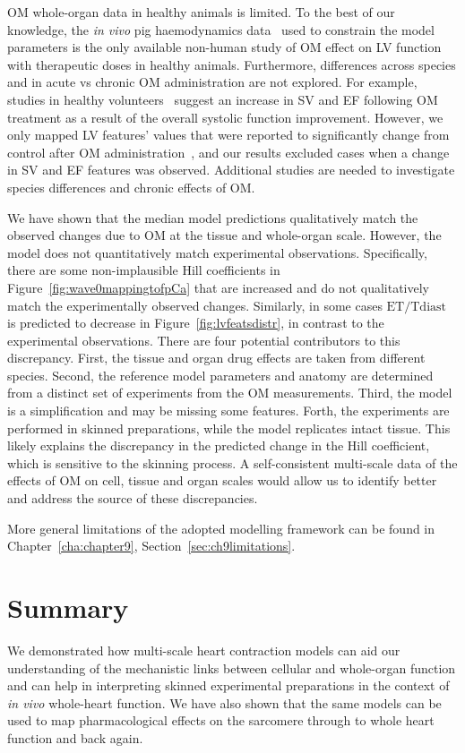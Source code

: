 \vspace{0.2cm}
OM whole-organ data in healthy animals is limited. To the best of our knowledge, the \textit{in vivo} pig haemodynamics data~\cite{Bakkehaug:2015} used to constrain the model parameters is the only available non-human study of OM effect on LV function with therapeutic doses in healthy animals. Furthermore, differences across species and in acute vs chronic OM administration are not explored. For example, studies in healthy volunteers~\cite{Teerlink:2011} suggest an increase in SV and EF following OM treatment as a result of the overall systolic function improvement. However, we only mapped LV features' values that were reported to significantly change from control after OM administration~\cite{Bakkehaug:2015}, and our results excluded cases when a change in SV and EF features was observed. Additional studies are needed to investigate species differences and chronic effects of OM.

\vspace{0.2cm}
We have shown that the median model predictions qualitatively match the observed changes due to OM at the tissue and whole-organ scale. However, the model does not quantitatively match experimental observations. Specifically, there are some non-implausible Hill coefficients in Figure~\ref{fig:wave0mappingtofpCa} that are increased and do not qualitatively match the experimentally observed changes. Similarly, in some cases $\textrm{ET}/\textrm{Tdiast}$ is predicted to decrease in Figure~\ref{fig:lvfeatsdistr}, in contrast to the experimental observations. There are four potential contributors to this discrepancy. First, the tissue and organ drug effects are taken from different species. Second, the reference model parameters and anatomy are determined from a distinct set of experiments from the OM measurements. Third, the model is a simplification and may be missing some features. Forth, the experiments are performed in skinned preparations, while the model replicates intact tissue. This likely explains the discrepancy in the predicted change in the Hill coefficient, which is sensitive to the skinning process. A self-consistent multi-scale data of the effects of OM on cell, tissue and organ scales would allow us to identify better and address the source of these discrepancies.

\vspace{0.2cm}
More general limitations of the adopted modelling framework can be found in Chapter~\ref{cha:chapter9}, Section~\ref{sec:ch9limitations}.


%
%
%
\section{Summary}\label{sec:ch5summary}
We demonstrated how multi-scale heart contraction models can aid our understanding of the mechanistic links between cellular and whole-organ function and can help in interpreting skinned experimental preparations in the context of \textit{in vivo} whole-heart function. We have also shown that the same models can be used to map pharmacological effects on the sarcomere through to whole heart function and back again.